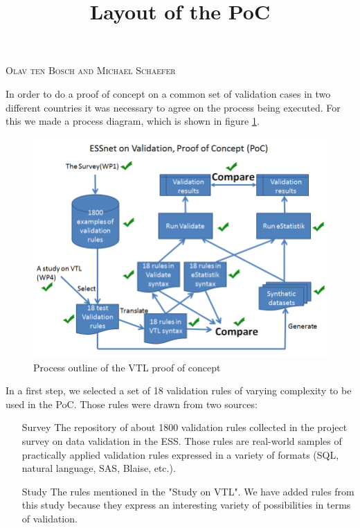 \title{Layout of the PoC}
\textsc{Olav ten Bosch and Michael Schaefer}
\vspace{0.6cm}

In order to do a proof of concept on a common set of validation cases in two
different countries it was necessary to agree on the process being executed.
For this we made a process diagram, which is shown in figure \ref{pocprocess}.


\begin{figure}[h!]
\begin{center}
\includegraphics[scale=0.5]{20151207ESSnetPoCProcess.PNG} 
\end{center}
\caption{Process outline of the VTL proof of concept}
\label{pocprocess}
\end{figure}

In a first step, we selected a set of 18 validation rules of varying complexity
to be used in the PoC. Those rules were drawn from two sources:

\begin{itemize}
\item[Survey]
The repository of about 1800 validation rules collected in the project survey on
data validation in the ESS. Those rules are real-world samples of practically
applied validation rules expressed in a variety of formats (SQL, natural language,
SAS, Blaise, etc.).
\item[Study]
The rules mentioned in the "Study on VTL". We have added rules from this study
because they express an interesting variety of possibilities in terms of validation.
\end{itemize}

